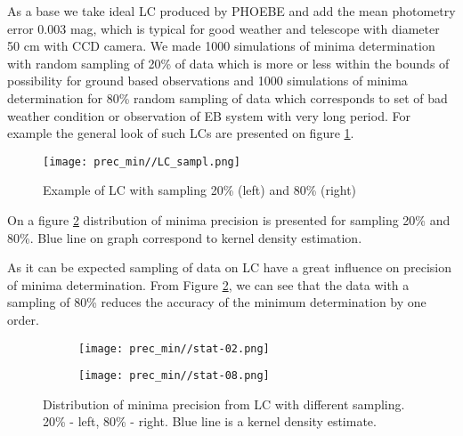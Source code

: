 As a base we take ideal LC produced by PHOEBE and add the mean photometry error 0.003 mag, which is typical for good weather and telescope with diameter 50 cm with CCD camera. 
We made 1000 simulations of minima determination with random sampling of 20\% of data which is more or less within the bounds of possibility for ground based observations and 1000 simulations of minima determination for 80\% random sampling of data which corresponds to set of bad weather condition or observation of EB system with very long period. 
For example the general look of such LCs are presented on figure \ref{fig:LC_sampl}.

\begin{figure}[!h]
    \centering
    \texttt{[image: prec\_min//LC\_sampl.png]}
    \caption{Example of LC with sampling 20\% (left) and 80\% (right)}
    \label{fig:LC_sampl}
\end{figure}


On a figure \ref{fig:sampl_diag} distribution of minima precision is presented for sampling 20\% and 80\%.
Blue line on graph correspond to kernel density estimation.

As it can be expected sampling of data on LC have a great influence on precision of minima determination. 
From Figure \ref{fig:sampl_diag}, we can see that the data with a sampling of 80\% reduces the accuracy of the minimum determination by one order.

\begin{figure}[!h]
    \centering
    \begin{subfigure}[t]{0.5\textwidth}
        \centering
        \texttt{[image: prec\_min//stat-02.png]}
    \end{subfigure}%
    \begin{subfigure}[t]{0.5\textwidth}
        \centering
        \texttt{[image: prec\_min//stat-08.png]}
    \end{subfigure}
    \caption{Distribution of minima precision from LC with different sampling. 20\% - left, 80\% - right. Blue line is a kernel density estimate.}
\label{fig:sampl_diag}
\end{figure}

